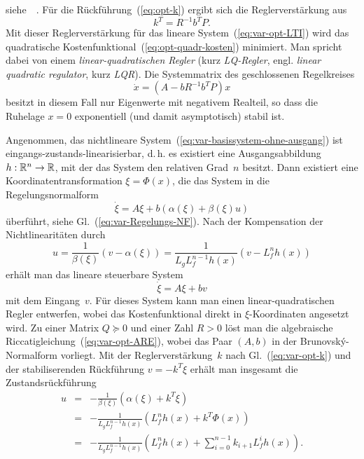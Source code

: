 siehe~~\cite{anderson1989,ludyk1995-2,lunze-rt2}. Für die Rückführung~(\ref{eq:opt-k})
ergibt sich die Reglerverstärkung aus
\begin{equation}
k^{T}=R^{-1}b^{T}P.\label{eq:var-opt-k}
\end{equation}
Mit dieser Reglerverstärkung für das lineare System~(\ref{eq:var-opt-LTI})
wird das quadratische Kostenfunktional~(\ref{eq:opt-quadr-kosten})
minimiert. Man spricht dabei von einem \emph{linear-quadratischen
Regler} (kurz \emph{LQ-Regler},
engl. \emph{linear quadratic regulator}, kurz \emph{LQR}). Die Systemmatrix
des geschlossenen Regelkreises 
\[
\dot{x}=\left(A-bR^{-1}b^{T}P\right)x
\]
besitzt in diesem Fall nur Eigenwerte mit negativem Realteil, so dass
die Ruhelage $x=0$ exponentiell (und damit asymptotisch) stabil ist. 

\medskip{}

Angenommen, das nichtlineare System~(\ref{eq:var-basissystem-ohne-ausgang})
ist eingangs-zustands-linearisierbar, d.\,h. es existiert eine Ausgangsabbildung
$h:{\mathbb{R}}^{n}\to{\mathbb{R}}$, mit der das System den relativen Grad~$n$ besitzt.
Dann existiert eine Koordinatentransformation $\xi=\Phi(x)$, die
das System in die Regelungsnormalform
\begin{equation}
\dot{\xi}=A\xi+b\left(\alpha(\xi)+\beta(\xi)u\right)\label{eq:var-opt-RNF}
\end{equation}
überführt, siehe Gl.~(\ref{eq:var-Regelungs-NF}). Nach der Kompensation
der Nichtlinearitäten durch
\begin{equation}
u=\frac{1}{\beta(\xi)}\left(v-\alpha(\xi)\right)=\frac{1}{L_{g}L_{f}^{n-1}h(x)}\left(v-L_{f}^{n}h(x)\right)\label{eq:opt-rueck-linearisierend}
\end{equation}
erhält man das lineare steuerbare System 
\begin{equation}
\dot{\xi}=A\xi+bv\label{eq:opt-linearisiertes-system}
\end{equation}
mit dem Eingang~$v$. Für dieses System kann man einen linear-quadratischen
Regler entwerfen, wobei das Kostenfunktional direkt in $\xi$-Koordinaten
angesetzt wird. Zu einer Matrix $Q\succeq0$ und einer Zahl $R>0$
löst man die algebraische Riccatigleichung~(\ref{eq:var-opt-ARE}),
wobei das Paar $(A,b)$ in der Brunovský-Normalform
vorliegt. Mit der Reglerverstärkung~$k$ nach Gl.~(\ref{eq:var-opt-k})
und der stabiliserenden Rückführung $v=-k^{T}\xi$ erhält man insgesamt
die Zustandsrückführung
\begin{equation}
\begin{array}{ccl}
u & = & -\frac{1}{\beta(\xi)}\left(\alpha(\xi)+k^{T}\xi\right)\\
 & = & -\frac{1}{L_{g}L_{f}^{n-1}h(x)}\left(L_{f}^{n}h(x)+k^{T}\Phi(x)\right)\\
 & = & -\frac{1}{L_{g}L_{f}^{n-1}h(x)}\left(L_{f}^{n}h(x)+\sum_{i=0}^{n-1}k_{i+1}L_{f}^{i}h(x)\right).
\end{array}\label{eq:opt-LQR-EZ-lin}
\end{equation}

